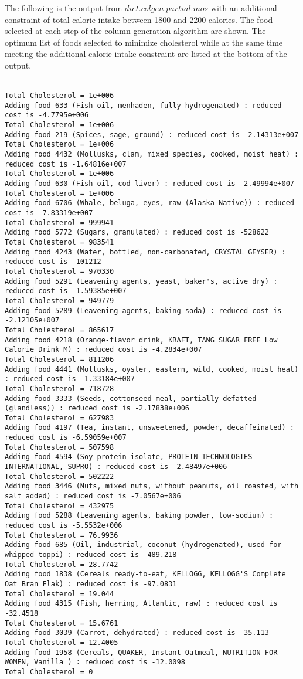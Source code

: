 \documentclass[twoside,12pt]{article}
\begin{document}
The following is the output from $diet.colgen.partial.mos$ with an additional constraint of total calorie intake between 1800 and 2200 calories. The food selected at each step of the column generation algorithm are shown. The optimum list of foods selected to minimize cholesterol while at the same time meeting the additional calorie intake constraint are listed at the bottom of the output.\\\\
\begin{verbatim}
Total Cholesterol = 1e+006
Adding food 633 (Fish oil, menhaden, fully hydrogenated) : reduced cost is -4.7795e+006
Total Cholesterol = 1e+006
Adding food 219 (Spices, sage, ground) : reduced cost is -2.14313e+007
Total Cholesterol = 1e+006
Adding food 4432 (Mollusks, clam, mixed species, cooked, moist heat) : reduced cost is -1.64816e+007
Total Cholesterol = 1e+006
Adding food 630 (Fish oil, cod liver) : reduced cost is -2.49994e+007
Total Cholesterol = 1e+006
Adding food 6706 (Whale, beluga, eyes, raw (Alaska Native)) : reduced cost is -7.83319e+007
Total Cholesterol = 999941
Adding food 5772 (Sugars, granulated) : reduced cost is -528622
Total Cholesterol = 983541
Adding food 4243 (Water, bottled, non-carbonated, CRYSTAL GEYSER) : reduced cost is -101212
Total Cholesterol = 970330
Adding food 5291 (Leavening agents, yeast, baker's, active dry) : reduced cost is -1.59385e+007
Total Cholesterol = 949779
Adding food 5289 (Leavening agents, baking soda) : reduced cost is -2.12105e+007
Total Cholesterol = 865617
Adding food 4218 (Orange-flavor drink, KRAFT, TANG SUGAR FREE Low Calorie Drink M) : reduced cost is -4.2834e+007
Total Cholesterol = 811206
Adding food 4441 (Mollusks, oyster, eastern, wild, cooked, moist heat) : reduced cost is -1.33184e+007
Total Cholesterol = 718728
Adding food 3333 (Seeds, cottonseed meal, partially defatted (glandless)) : reduced cost is -2.17838e+006
Total Cholesterol = 627983
Adding food 4197 (Tea, instant, unsweetened, powder, decaffeinated) : reduced cost is -6.59059e+007
Total Cholesterol = 507598
Adding food 4594 (Soy protein isolate, PROTEIN TECHNOLOGIES INTERNATIONAL, SUPRO) : reduced cost is -2.48497e+006
Total Cholesterol = 502222
Adding food 3446 (Nuts, mixed nuts, without peanuts, oil roasted, with salt added) : reduced cost is -7.0567e+006
Total Cholesterol = 432975
Adding food 5288 (Leavening agents, baking powder, low-sodium) : reduced cost is -5.5532e+006
Total Cholesterol = 76.9936
Adding food 685 (Oil, industrial, coconut (hydrogenated), used for whipped toppi) : reduced cost is -489.218
Total Cholesterol = 28.7742
Adding food 1838 (Cereals ready-to-eat, KELLOGG, KELLOGG'S Complete Oat Bran Flak) : reduced cost is -97.0831
Total Cholesterol = 19.044
Adding food 4315 (Fish, herring, Atlantic, raw) : reduced cost is -32.4518
Total Cholesterol = 15.6761
Adding food 3039 (Carrot, dehydrated) : reduced cost is -35.113
Total Cholesterol = 12.4005
Adding food 1958 (Cereals, QUAKER, Instant Oatmeal, NUTRITION FOR WOMEN, Vanilla ) : reduced cost is -12.0098
Total Cholesterol = 0


\end{verbatim}
\end{document}
